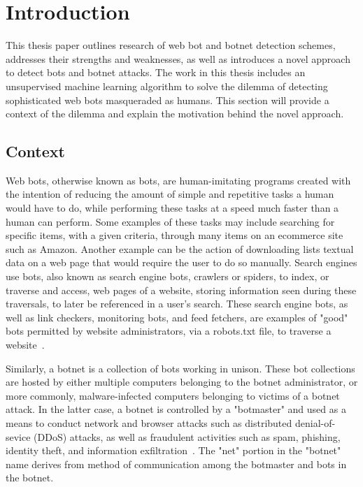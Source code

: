 ﻿
\chapter{Introduction}\label{ch:introduction}
This thesis paper outlines research of web bot and botnet detection schemes, addresses their strengths and weaknesses, as well as introduces a novel approach to detect bots and botnet attacks.
The work in this thesis includes an unsupervised machine learning algorithm to solve the dilemma of detecting sophisticated web bots masqueraded as humans. This section will provide a context of the dilemma and explain the motivation behind the novel approach. %

\section{Context}\label{sec:context}
Web bots, otherwise known as bots, are human-imitating programs created with the intention of reducing the amount of simple and repetitive tasks a human would have to do, while performing these tasks at a speed much faster than a human can perform.
Some examples of these tasks may include searching for specific items, with a given criteria, through many items on an ecommerce site such as Amazon.
Another example can be the action of downloading lists textual data on a web page that would require the user to do so manually.
Search engines use bots, also known as search engine bots, crawlers or spiders, to index, or traverse and access, web pages of a website, storing information seen during these traversals, to later be referenced in a user's search.
These search engine bots, as well as link checkers, monitoring bots, and feed fetchers, are examples of "good" bots permitted by website administrators, via a robots.txt file, to traverse a website~\cite{ROVETTA2020102577}.

Similarly, a botnet is a collection of bots working in unison.
These bot collections are hosted by either multiple computers belonging to the botnet administrator, or more commonly, malware-infected computers belonging to victims of a botnet attack.
In the latter case, a botnet is controlled by a "botmaster" and used as a means to conduct network and browser attacks such as distributed denial-of-sevice (DDoS) attacks, as well as fraudulent activities such as spam, phishing, identity theft, and information exfiltration~\cite{inproceedings}.
The "net" portion in the "botnet" name derives from method of communication among the botmaster and bots in the botnet.

